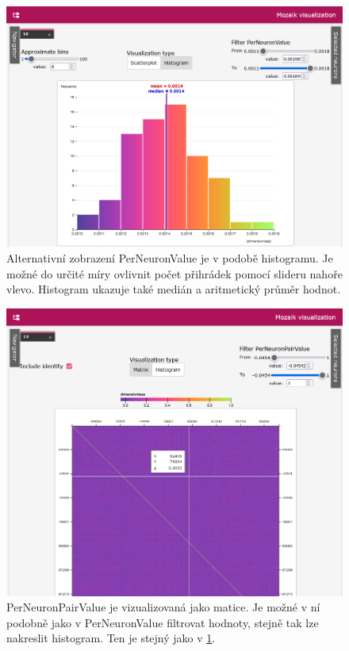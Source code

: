 \begin{figure}
	\centering
	\includegraphics[width=1\linewidth]{img/screenshot_pnv_histogram.png}
	\caption{Alternativní zobrazení PerNeuronValue je v podobě histogramu. Je možné do určité míry ovlivnit počet přihrádek pomocí slideru nahoře vlevo. Histogram ukazuje také medián a aritmetický průměr hodnot.}
	\label{fig:pnv_histogram}
\end{figure}

\begin{figure}
	\centering
	\includegraphics[width=1\linewidth]{img/screenshot_pnpv.png}
	\caption{PerNeuronPairValue je vizualizovaná jako matice. Je možné v ní podobně jako v PerNeuronValue filtrovat hodnoty, stejně tak lze nakreslit histogram. Ten je stejný jako v \ref{fig:pnv_histogram}.}
	\label{fig:pnpv}
\end{figure}


